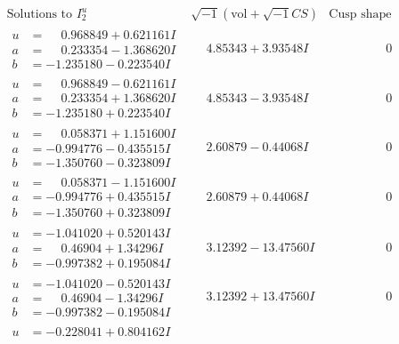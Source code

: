 \documentclass[1p]{elsarticle_modified}
\theoremstyle{definition}
\newcommand{\I}{\sqrt{-1}}
\begin{document}
$$\begin{array}{c|c|c}
\text{Solutions to }I^u_{2}& \I (\text{vol} + \sqrt{-1}CS) & \text{Cusp shape}\\
 \hline 
\begin{aligned}
u &= \phantom{-}0.968849 + 0.621161 I \\
a &= \phantom{-}0.233354 - 1.368620 I \\
b &= -1.235180 - 0.223540 I\end{aligned}
 & \phantom{-}4.85343 + 3.93548 I & \phantom{-0.000000 } 0 \\ \hline\begin{aligned}
u &= \phantom{-}0.968849 - 0.621161 I \\
a &= \phantom{-}0.233354 + 1.368620 I \\
b &= -1.235180 + 0.223540 I\end{aligned}
 & \phantom{-}4.85343 - 3.93548 I & \phantom{-0.000000 } 0 \\ \hline\begin{aligned}
u &= \phantom{-}0.058371 + 1.151600 I \\
a &= -0.994776 - 0.435515 I \\
b &= -1.350760 - 0.323809 I\end{aligned}
 & \phantom{-}2.60879 - 0.44068 I & \phantom{-0.000000 } 0 \\ \hline\begin{aligned}
u &= \phantom{-}0.058371 - 1.151600 I \\
a &= -0.994776 + 0.435515 I \\
b &= -1.350760 + 0.323809 I\end{aligned}
 & \phantom{-}2.60879 + 0.44068 I & \phantom{-0.000000 } 0 \\ \hline\begin{aligned}
u &= -1.041020 + 0.520143 I \\
a &= \phantom{-}0.46904 + 1.34296 I \\
b &= -0.997382 + 0.195084 I\end{aligned}
 & \phantom{-}3.12392 - 13.47560 I & \phantom{-0.000000 } 0 \\ \hline\begin{aligned}
u &= -1.041020 - 0.520143 I \\
a &= \phantom{-}0.46904 - 1.34296 I \\
b &= -0.997382 - 0.195084 I\end{aligned}
 & \phantom{-}3.12392 + 13.47560 I & \phantom{-0.000000 } 0 \\ \hline\begin{aligned}
u &= -0.228041 + 0.804162 I \\

\end{aligned}
\end{array}$$
\end{document}
